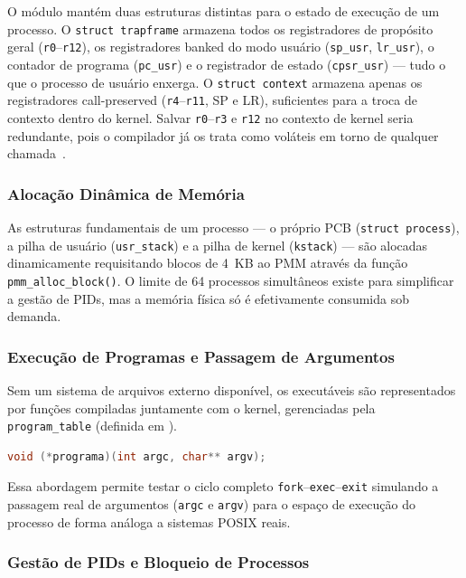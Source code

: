 O módulo mantém duas estruturas distintas para o estado de execução de um
processo. O \texttt{struct trapframe} armazena todos os registradores de
propósito geral (\texttt{r0}--\texttt{r12}), os registradores banked do modo usuário
(\texttt{sp\_usr}, \texttt{lr\_usr}), o contador de programa (\texttt{pc\_usr})
e o registrador de estado (\texttt{cpsr\_usr}) — tudo o que o processo de
usuário enxerga. O \texttt{struct context} armazena apenas os registradores
call-preserved (\texttt{r4}--\texttt{r11}, SP e LR), suficientes para a troca de contexto
dentro do kernel. Salvar \texttt{r0}--\texttt{r3} e \texttt{r12} no contexto de kernel seria redundante,
pois o compilador já os trata como voláteis em torno de qualquer
chamada~\cite{arm:armv7ar}.

\subsubsection{Alocação Dinâmica de Memória}

As estruturas
fundamentais de um processo — o próprio PCB (\texttt{struct process}),
a pilha de usuário (\texttt{usr\_stack}) e a pilha de kernel (\texttt{kstack}) —
são alocadas dinamicamente requisitando blocos de 4~KB ao PMM através da 
função \texttt{pmm\_alloc\_block()}. O limite de 64 processos simultâneos existe para simplificar a gestão de PIDs, mas a memória física só é
efetivamente consumida sob demanda.

\subsubsection{Execução de Programas e Passagem de Argumentos}

Sem um sistema de arquivos externo disponível, os executáveis são representados
por funções compiladas juntamente com o kernel, gerenciadas pela
\texttt{program\_table} (definida em ).

\lstset{captionpos=t}
\begin{lstlisting}[language=C, caption={Assinatura padronizada dos programas}]
void (*programa)(int argc, char** argv);
\end{lstlisting}
\lstset{captionpos=b}

Essa abordagem permite testar o ciclo completo \texttt{fork}--\texttt{exec}--\texttt{exit} 
simulando a passagem real de argumentos (\texttt{argc} e \texttt{argv}) para o 
espaço de execução do processo de forma análoga a sistemas POSIX reais.

\subsubsection{Gestão de PIDs e Bloqueio de Processos}

